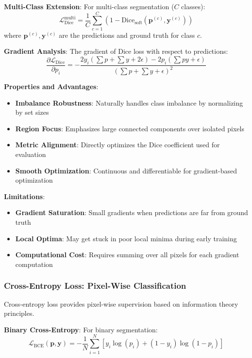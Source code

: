 \documentclass[12pt,a4paper]{article}
\begin{document}
\textbf{Multi-Class Extension}:
For multi-class segmentation ($C$ classes):
\begin{equation}
\mathcal{L}_{\text{Dice}}^{\text{multi}} = \frac{1}{C} \sum_{c=1}^C \left(1 - \text{Dice}_{\text{soft}}(\mathbf{p}^{(c)}, \mathbf{y}^{(c)})\right)
\end{equation}
where $\mathbf{p}^{(c)}, \mathbf{y}^{(c)}$ are the predictions and ground truth for class $c$.

\textbf{Gradient Analysis}:
The gradient of Dice loss with respect to predictions:
\begin{equation}
\frac{\partial \mathcal{L}_{\text{Dice}}}{\partial p_i} = -\frac{2 y_i (\sum p + \sum y + 2\epsilon) - 2 p_i (\sum p y + \epsilon)}{(\sum p + \sum y + \epsilon)^2}
\end{equation}

\textbf{Properties and Advantages}:
\begin{itemize}
    \item \textbf{Imbalance Robustness}: Naturally handles class imbalance by normalizing by set sizes
    \item \textbf{Region Focus}: Emphasizes large connected components over isolated pixels
    \item \textbf{Metric Alignment}: Directly optimizes the Dice coefficient used for evaluation
    \item \textbf{Smooth Optimization}: Continuous and differentiable for gradient-based optimization
\end{itemize}

\textbf{Limitations}:
\begin{itemize}
    \item \textbf{Gradient Saturation}: Small gradients when predictions are far from ground truth
    \item \textbf{Local Optima}: May get stuck in poor local minima during early training
    \item \textbf{Computational Cost}: Requires summing over all pixels for each gradient computation
\end{itemize}

\subsubsection{Cross-Entropy Loss: Pixel-Wise Classification}

Cross-entropy loss provides pixel-wise supervision based on information theory principles.

\textbf{Binary Cross-Entropy}:
For binary segmentation:
\begin{equation}
\mathcal{L}_{\text{BCE}}(\mathbf{p}, \mathbf{y}) = -\frac{1}{N} \sum_{i=1}^N \left[ y_i \log(p_i) + (1 - y_i) \log(1 - p_i) \right]
\end{equation}
\end{document}
